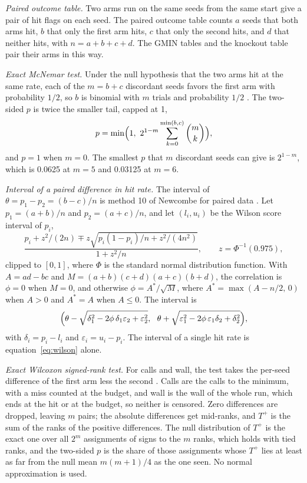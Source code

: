\documentclass[journal=jctcce,manuscript=suppinfo]{achemso}
\begin{document}
\emph{Paired outcome table.}
Two arms run on the same seeds from the same start give a pair of hit flags
on each seed.
The paired outcome table counts \(a\) seeds that both arms hit, \(b\) that
only the first arm hits, \(c\) that only the second hits, and \(d\) that
neither hits, with \(n=a+b+c+d\).
The GMIN tables and the knockout table pair their arms in this way.

\emph{Exact McNemar test.}
Under the null hypothesis that the two arms hit at the same rate, each of the
\(m=b+c\) discordant seeds favors the first arm with probability \(1/2\), so
\(b\) is binomial with \(m\) trials and probability \(1/2\)
\cite{mcnemarNoteSamplingError1947}.
The two-sided \(p\) is twice the smaller tail, capped at 1,
\begin{equation}
p = \min\Bigl(1,\ 2^{1-m}\sum_{k=0}^{\min(b,c)} \binom{m}{k}\Bigr),
\label{eq:mcnemar}
\end{equation}
and \(p=1\) when \(m=0\).
The smallest \(p\) that \(m\) discordant seeds can give is \(2^{1-m}\), which
is 0.0625 at \(m=5\) and 0.03125 at \(m=6\).

\emph{Interval of a paired difference in hit rate.}
The interval of \(\theta=p_1-p_2=(b-c)/n\) is method 10 of Newcombe for
paired data \cite{newcombeImprovedConfidenceIntervals1998}.
Let \(p_1=(a+b)/n\) and \(p_2=(a+c)/n\), and let \((l_i,u_i)\) be the Wilson
score interval \cite{wilsonProbableInferenceLaw1927} of \(p_i\),
\begin{equation}
\frac{p_i + z^2/(2n) \mp z\sqrt{p_i(1-p_i)/n + z^2/(4n^2)}}{1+z^2/n},
\qquad z = \Phi^{-1}(0.975),
\label{eq:wilson}
\end{equation}
clipped to \([0,1]\), where \(\Phi\) is the standard normal distribution function.
With \(A=ad-bc\) and \(M=(a+b)(c+d)(a+c)(b+d)\), the correlation is
\(\phi=0\) when \(M=0\), and otherwise
\(\phi=A^{\ast}/\sqrt{M}\), where \(A^{\ast}=\max(A-n/2,\,0)\) when \(A>0\)
and \(A^{\ast}=A\) when \(A\le 0\).
The interval is
\begin{equation}
\Bigl(\theta - \sqrt{\delta_1^2 - 2\phi\,\delta_1\varepsilon_2 + \varepsilon_2^2},\ \
\theta + \sqrt{\varepsilon_1^2 - 2\phi\,\varepsilon_1\delta_2 + \delta_2^2}\Bigr),
\label{eq:newcombe}
\end{equation}
with \(\delta_i=p_i-l_i\) and \(\varepsilon_i=u_i-p_i\).
The interval of a single hit rate is equation~\ref{eq:wilson} alone.

\emph{Exact Wilcoxon signed-rank test.}
For calls and wall, the test takes the per-seed difference of the first arm
less the second \cite{wilcoxonIndividualComparisons1945}.
Calls are the calls to the minimum, with a miss counted at the budget, and
wall is the wall of the whole run, which ends at the hit or at the budget, so
neither is censored.
Zero differences are dropped, leaving \(m\) pairs; the absolute differences
get mid-ranks, and \(T^{+}\) is the sum of the ranks of the positive
differences.
The null distribution of \(T^{+}\) is the exact one over all \(2^m\)
assignments of signs to the \(m\) ranks, which holds with tied ranks, and the
two-sided \(p\) is the share of those assignments whose \(T^{+}\) lies at
least as far from the null mean \(m(m+1)/4\) as the one seen.
No normal approximation is used.
\end{document}
